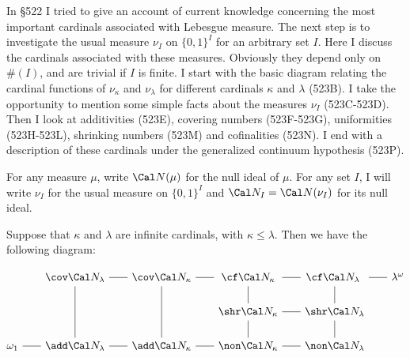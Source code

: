 
\def\chaptername{Cardinal functions of measure theory}
\def\sectionname{The measure of $\{0,1\}^I$}


\def\headlinesectionname{The measure of
$\{0,1{\delimiter"5267309 }^I$}

In \S522 I tried to give an account of current knowledge concerning
the most important cardinals associated with Lebesgue measure.   The
next step is to investigate the usual measure $\nu_I$ on $\{0,1\}^I$
for an arbitrary set $I$.   Here I discuss the cardinals
associated with these measures.   Obviously they depend only on $\#(I)$,
and are trivial if $I$ is finite.   I start with the basic diagram
relating the cardinal functions
of $\nu_{\kappa}$ and $\nu_{\lambda}$ for different cardinals $\kappa$
and $\lambda$ (523B).   I take the opportunity to mention some simple facts
about the measures $\nu_I$ (523C-523D). %
Then I look at additivities (523E), covering numbers (523F-523G),
uniformities (523H-523L), %
shrinking numbers (523M) and cofinalities (523N).   I end with a
description of these cardinals under the generalized continuum
hypothesis (523P).

 For any measure $\mu$, write $\Cal N(\mu)$ for
the null ideal of $\mu$.   For any set $I$, I will write $\nu_I$ for
the usual measure on $\{0,1\}^I$ and $\Cal N_I=\Cal N(\nu_I)$ for its
null ideal.   

 Suppose that $\kappa$ and $\lambda$ are
infinite cardinals, with $\kappa\le\lambda$.   Then we have the
following
diagram:

\def\tmphrule{\hskip0.4em\raise
2.5pt\hbox{\leaders\hrule\hskip1.7em\hfil}\hskip0.4em}
\def\tmpstrut{\vrule height10.5pt depth5.5pt width0pt}

$$\vbox{\offinterlineskip
\halign{\hfil#\hfil&\hfil#\hfil&\hfil#\hfil&\hfil#\hfil
  &\hfil#\hfil&\hfil#\hfil&\hfil#\hfil
  &\hfil#\hfil&\hfil#\hfil&\hfil#\hfil
  &\hfil#\hfil&\hfil#\hfil&\hfil#\hfil&\hfil#\hfil\cr
&\tmpstrut&$\cov\Cal N_{\lambda}$&\tmphrule
  &$\cov\Cal N_{\kappa}$&\tmphrule
  &$\cf\Cal N_{\kappa}$&\tmphrule&$\cf\Cal N_{\lambda}$
  &\tmphrule&$\lambda^{\omega}$\cr
&\tmpstrut&\vrule&&\vrule&&\vrule&&\vrule\cr
&\tmpstrut&\vrule&&\vrule&&$\shr\Cal N_{\kappa}$&\tmphrule
  &$\shr\Cal N_{\lambda}$\cr
&\tmpstrut&\vrule&&\vrule&&\vrule&&\vrule\cr
$\tmpstrut\omega_1$&\tmphrule&$\add\Cal N_{\lambda}$&\tmphrule
  &$\add\Cal N_{\kappa}$&\tmphrule
  &$\non\Cal N_{\kappa}$&\tmphrule&$\non\Cal N_{\lambda}$\cr
}}$$

